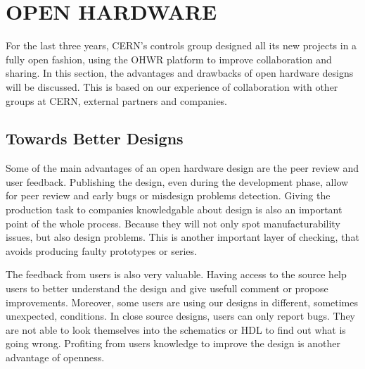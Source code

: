 \documentclass{JAC2003}
\begin{document}
\section{OPEN HARDWARE}
%

For the last three years, CERN's controls group designed all its new projects in a fully open fashion, using the OHWR platform to improve collaboration and sharing.
In this section, the advantages and drawbacks of open hardware designs will be discussed.
This is based on our experience of collaboration with other groups at CERN, external partners and companies.

\subsection{Towards Better Designs}
Some of the main advantages of an open hardware design are the peer review and user feedback.
Publishing the design, even during the development phase, allow for peer review and early bugs or misdesign problems detection.
Giving the production task to companies knowledgable about design is also an important point of the whole process.
Because they will not only spot manufacturability issues, but also design problems.
This is another important layer of checking, that avoids producing faulty prototypes or series.

The feedback from users is also very valuable.
Having access to the source help users to better understand the design and give usefull comment or propose improvements.
Moreover, some users are using our designs in different, sometimes unexpected, conditions.
In close source designs, users can only report bugs.
They are not able to look themselves into the schematics or HDL to find out what is going wrong.
Profiting from users knowledge to improve the design is another advantage of openness.
\end{document}
